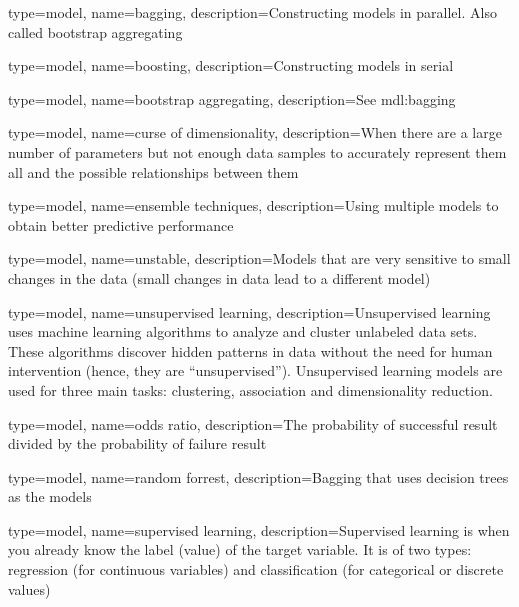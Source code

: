 

{
	type=model,
    name=bagging,
    description={Constructing models in parallel.  Also called bootstrap aggregating}
}

{
	type=model,
    name=boosting,
    description={Constructing models in serial}
}

{
	type=model,
    name=bootstrap aggregating,
    description={See \gls{mdl:bagging}}
}

{
	type=model,
    name=curse of dimensionality,
    description={When there are a large number of parameters but not enough data samples to accurately represent them all and the possible relationships between them}
}

{
	type=model,
    name=ensemble techniques,
    description={Using multiple models to obtain better predictive performance}
}

{
	type=model,
    name=unstable,
    description={Models that are very sensitive to small changes in the data (small changes in data lead to a different model)}
}

{
	type=model,
    name=unsupervised learning,
    description={Unsupervised learning uses machine learning algorithms to analyze and cluster unlabeled data sets. These algorithms discover hidden patterns in data without the need for human intervention (hence, they are ``unsupervised'').  Unsupervised learning models are used for three main tasks: clustering, association and dimensionality reduction.}
}

{
	type=model,
    name=odds ratio,
    description={The probability of successful result divided by the probability of failure result}
}

{
	type=model,
    name=random forrest,
    description={Bagging that uses decision trees as the models}
}

{
	type=model,
    name=supervised learning,
    description={Supervised learning is when you already know the label (value) of the target variable. It is of two types: regression (for continuous variables) and classification (for categorical or discrete values)}
} 
